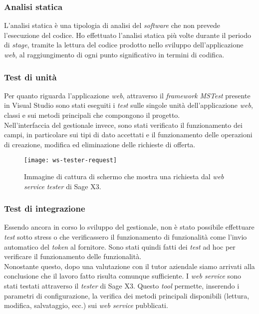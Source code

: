 \subsubsection{Analisi statica}
L'analisi statica è una tipologia di analisi del \textit{software} che non prevede l'esecuzione del codice.
Ho effettuato l'analisi statica più volte durante il periodo di \textit{stage}, tramite la lettura del codice prodotto nello sviluppo dell'applicazione \textit{web}, al raggiungimento di ogni punto significativo in termini di codifica.

\subsubsection{Test di unità}
Per quanto riguarda l'applicazione \textit{web}, attraverso il \textit{framework} \textit{MSTest} presente in Visual Studio sono stati eseguiti i \textit{test} sulle singole unità dell'applicazione \textit{web}, classi e sui metodi principali che compongono il progetto.\\
Nell'interfaccia del gestionale invece, sono stati verificato il funzionamento dei campi, in particolare sui tipi di dato accettati e il funzionamento delle operazioni di creazione, modifica ed eliminazione delle richieste di offerta.


\vspace{20pt}

\begin{figure}[htbp]
	\begin{center}
		\texttt{[image: ws-tester-request]}
		\caption{Immagine di cattura di schermo che mostra una richiesta dal \textit{web service} \textit{tester} di Sage X3.}
	\end{center}
\end{figure}


\subsubsection{Test di integrazione}
Essendo ancora in corso lo sviluppo del gestionale, non è stato possibile effettuare \textit{test} sotto stress o che verificassero il funzionamento di funzionalità come l'invio automatico del \textit{token} al fornitore. Sono stati quindi fatti dei \textit{test} ad hoc per verificare il funzionamento delle funzionalità.\\
Nonostante questo, dopo una valutazione con il tutor aziendale siamo arrivati alla conclusione che il lavoro fatto risulta comunque sufficiente.
I \textit{web service} sono stati testati attraverso il \textit{tester} di Sage X3. Questo \textit{tool} permette, inserendo i parametri di configurazione, la verifica dei metodi principali disponibili (lettura, modifica, salvataggio, ecc.) sui \textit{web service} pubblicati.


